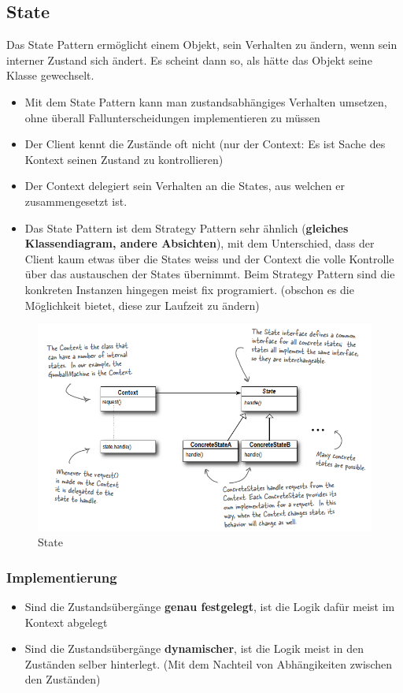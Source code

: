 \subsection{State}
\label{sec:state}
Das State Pattern ermöglicht einem Objekt, sein Verhalten zu ändern, wenn sein interner Zustand sich ändert. Es scheint dann so, als hätte das Objekt seine Klasse gewechselt.
\begin{itemize}
	\item Mit dem State Pattern kann man zustandsabhängiges Verhalten umsetzen, ohne überall Fallunterscheidungen implementieren zu müssen
	\item Der Client kennt die Zustände oft nicht (nur der Context: Es ist Sache des Kontext seinen Zustand zu kontrollieren)
	\item Der Context delegiert sein Verhalten an die States, aus welchen er zusammengesetzt ist.
	\item Das State Pattern ist dem Strategy Pattern sehr ähnlich (\textbf{gleiches Klassendiagram, andere Absichten}), mit dem Unterschied, dass der Client kaum etwas über die States weiss und der Context die volle Kontrolle über das austauschen der States übernimmt. Beim Strategy Pattern sind die konkreten Instanzen hingegen meist fix programiert. (obschon es die Möglichkeit bietet, diese zur Laufzeit zu ändern)
\end{itemize}

\begin{figure}[h]
	\centering
	\includegraphics[width=0.65\linewidth]{images/state_pattern}
	\caption{State}
	\label{fig:statepattern}
\end{figure}

\subsubsection{Implementierung}
\begin{itemize}
	\item Sind die Zustandsübergänge \textbf{genau festgelegt}, ist die Logik dafür meist im Kontext abgelegt
	\item Sind die Zustandsübergänge \textbf{dynamischer}, ist die Logik meist in den Zuständen selber hinterlegt. (Mit dem Nachteil von Abhängikeiten zwischen den Zuständen)
\end{itemize}



